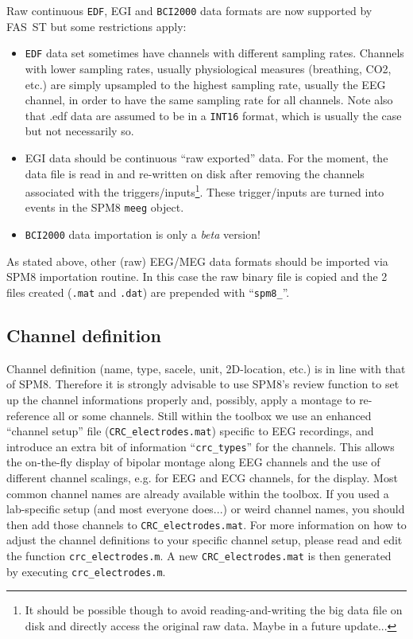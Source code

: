 \documentclass[a4paper,titlepage]{article}
\def\dblS{\hbox{S\hskip -4.5pt S}}
\newcommand{\bi}{\begin{itemize}}
\newcommand{\ei}{\end{itemize}}
\newcommand{\fasst}{FA\dblS T } 	%
\begin{document}
Raw continuous {\tt EDF}, EGI and {\tt BCI2000} data formats are now supported by \fasst but some restrictions apply: %
\bi
\item {\tt EDF} data set sometimes have channels with different sampling rates. Channels with lower sampling rates, usually physiological measures (breathing, CO2, etc.) are simply upsampled to the highest sampling rate, usually the EEG channel, in order to have the same sampling rate for all channels. Note also that .edf data are assumed to be in a {\tt INT16} format, which is usually the case but not necessarily so.
\item EGI data should be continuous ``raw exported'' data. For the moment, the data file is read in and re-written on disk after removing the channels associated with the triggers/inputs\footnote{It should be possible though to avoid reading-and-writing the big data file on disk and directly access the original raw data. Maybe in a future update...}. These trigger/inputs are turned into events in the SPM8 {\tt meeg} object.
\item {\tt BCI2000} data importation is only a {\it beta} version!
\ei
As stated above, other (raw) EEG/MEG data formats should be imported via SPM8 importation routine. In this case the raw binary file is copied and the 2 files created ({\tt *.mat} and {\tt *.dat}) are prepended with ``{\tt spm8\_}''.

\subsection{Channel definition}
\label{sec:chandef}
Channel definition (name, type, sacele, unit, 2D-location, etc.) is in line with that of SPM8. Therefore it is strongly advisable to use SPM8's review function to set up the channel informations properly and, possibly, apply a montage to re-reference all or some channels. 
Still within the toolbox we use an enhanced ``channel setup'' file ({\tt CRC\_electrodes.mat})  specific to EEG recordings, and introduce an extra bit of information ``{\tt crc\_types}'' for the channels. This allows the on-the-fly display of bipolar montage along EEG channels and the use of different channel scalings, e.g. for EEG and ECG channels, for the display. Most common channel names are already available within the toolbox. If you used a lab-specific setup (and most everyone does...) or weird channel names, you should then add those channels to {\tt CRC\_electrodes.mat}.
For more information on how to adjust the channel definitions to your specific channel setup, please read and edit the function {\tt crc\_electrodes.m}. A new {\tt CRC\_electrodes.mat} is then generated by executing {\tt crc\_electrodes.m}. %
\end{document}
